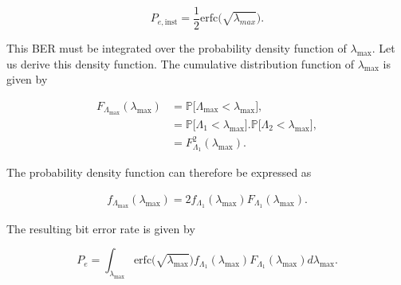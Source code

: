 \documentclass [a4paper, 11pt] {article}
\begin{document}
\begin{solution}
\begin{enumerate}
\begin{equation}P_{e,\text{inst}} = \frac{1}{2}\text{erfc}\big(\sqrt{\lambda_{max}}\big).\end{equation}

This BER must be integrated over the probability density function of $\lambda_{\text{max}}$. Let us derive this density function. 
The cumulative distribution function of $\lambda_{\text{max}}$ is given by 

\begin{align}
    F_{\Lambda_{\text{max}}} (\lambda_{\text{max}}) &= \mathbb{P}\Big[\Lambda_{\text{max}} < \lambda_{\text{max}} \Big], \\
    &= \mathbb{P}\Big[\Lambda_1 < \lambda_{\text{max}} \Big]. \mathbb{P}\Big[\Lambda_2 < \lambda_{\text{max}} \Big], \\
    &= F_{\Lambda_1}^2(\lambda_{\text{max}}).
\end{align}

The probability density function can therefore be expressed as 

\begin{align}
     f_{\Lambda_{\text{max}}} (\lambda_{\text{max}}) = 2f_{\Lambda_1}(\lambda_{\text{max}}) F_{\Lambda_1}(\lambda_{\text{max}}).
\end{align}

The resulting bit error rate is given by

\begin{equation}P_{e} = \int_{\lambda_{\text{max}}} \text{erfc}\big(\sqrt{\lambda_{\text{max}}}\big) f_{\Lambda_1}(\lambda_{\text{max}}) F_{\Lambda_1}(\lambda_{\text{max}}) d\lambda_{\text{max}}.\end{equation}

\end{enumerate}
    \end{solution}
\end{document}
